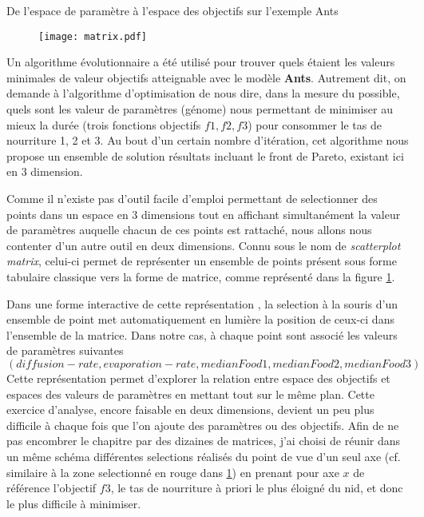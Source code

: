 
\begin{framewithtitle}[]{De l'espace de paramètre à l'espace des objectifs sur l'exemple Ants }

\begin{figure}[H]
	 \centering
	 	\texttt{[image: matrix.pdf]}
	 	\label{fig:matrice}
\end{figure}

Un algorithme évolutionnaire a été utilisé pour trouver quels étaient les valeurs minimales de valeur objectifs atteignable avec le modèle \textbf{Ants}. Autrement dit, on demande à l'algorithme d'optimisation de nous dire, dans la mesure du possible, quels sont les valeur de paramètres (génome) nous permettant de minimiser au mieux la durée (trois fonctions objectifs ${f1,f2,f3}$) pour consommer le tas de nourriture 1, 2 et 3. Au bout d'un certain nombre d'itération, cet algorithme nous propose un ensemble de solution résultats incluant le front de Pareto, existant ici en 3 dimension.

Comme il n'existe pas d'outil facile d'emploi permettant de selectionner des points dans un espace en 3 dimensions tout en affichant simultanément la valeur de paramètres auquelle chacun de ces points est rattaché, nous allons nous contenter d'un autre outil en deux dimensions. Connu sous le nom de \textit{scatterplot matrix}, celui-ci permet de représenter un ensemble de points présent sous forme tabulaire classique vers la forme de matrice, comme représenté dans la figure \ref{fig:matrice}. 

Dans une forme interactive de cette représentation , la selection à la souris d'un ensemble de point met automatiquement en lumière la position de ceux-ci dans l'ensemble de la matrice. Dans notre cas, à chaque point sont associé les valeurs de paramètres suivantes $(diffusion-rate,evaporation-rate, medianFood1, medianFood2, medianFood3)$ Cette représentation permet d'explorer la relation entre espace des objectifs et espaces des valeurs de paramètres en mettant tout sur le même plan. Cette exercice d'analyse, encore faisable en deux dimensions, devient un peu plus difficile à chaque fois que l'on ajoute des paramètres ou des objectifs. Afin de ne pas encombrer le chapitre par des dizaines de matrices, j'ai choisi de réunir dans un même schéma différentes selections réalisés du point de vue d'un seul axe (cf. similaire à la zone selectionné en rouge dans \ref{fig:matrice}) en prenant pour axe $x$ de référence l'objectif $f3$, le tas de nourriture à priori le plus éloigné du nid, et donc le plus difficile à minimiser.


\end{framewithtitle}
